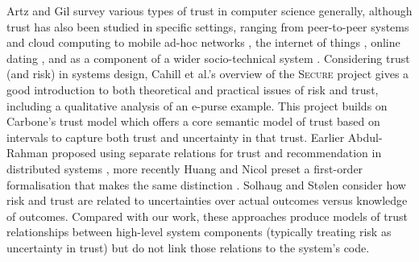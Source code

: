 Artz and Gil \cite{artz-trust-survey-2007} survey various
types of trust in computer science generally, although trust has also
been studied in specific settings, 
%
ranging from peer-to-peer systems \cite{aberer-trust-p2p-2001} and
cloud computing \cite{habib-trust-cloud-2011} 
to mobile ad-hoc networks \cite{cho-trust-survey-adhocnets-2011}, 
the internet of things \cite{lize-trust-IoT-2014}, 
online dating \cite{norcie-trust-online-dating},
and as a component of a wider socio-technical system
\cite{cho-trust-sustainable-2013,walter-trust-cloud-ecis2013}. 
%
Considering trust (and risk) in systems design, Cahill et al.'s overview
of the \textsc{Secure} project \cite{cahill-trust-pervasive-2003}
gives a good introduction to both theoretical and practical issues of
risk and trust, including a qualitative analysis of an e-purse
example. This project builds on Carbone's trust model
\cite{carbone-formal-trust-2003} which offers a core semantic model of
trust based on intervals to capture both trust and uncertainty in that
trust. Earlier Abdul-Rahman proposed using separate relations for
trust and recommendation in distributed systems
\cite{abdul-rahman-distributed-trust-1998}, more recently Huang and
Nicol preset a first-order formalisation that makes the same
distinction \cite{huang-formal-semantics-trust-calculus-2010}.
Solhaug and St{\o}len \cite{solhaug-trust-uncertainty-2011} 
consider how risk and trust are related to uncertainties over
actual outcomes versus knowledge of outcomes.
Compared with our work, these approaches produce models of trust
relationships between high-level system components 
(typically treating risk as uncertainty in trust) 
but do not link those relations to the system's code. 


